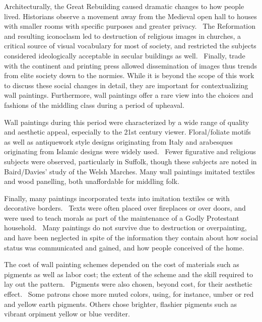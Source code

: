 Architecturally, the Great Rebuilding caused dramatic changes to how people lived. Historians observe a movement away from the Medieval open hall to houses with smaller rooms with specific purposes and greater privacy.~\autocite{Baird_thesis,Davies_book,Hamling_book} The Reformation and resulting iconoclasm led to destruction of religious images in churches, a critical source of visual vocabulary for most of society, and restricted the subjects considered ideologically acceptable in secular buildings as well.~\autocite{Kirkham_thesis,Hamling_book,Giles} Finally, trade with the continent and printing press allowed dissemination of images thus trends from elite society down to the normies. While it is beyond the scope of this work to discuss these social changes in detail, they are important for contextualizing wall paintings. Furthermore, wall paintings offer a rare view into the choices and fashions of the middling class during a period of upheaval.~\autocite{Kirkham_thesis,Baird_thesis}

Wall paintings during this period were characterized by a wide range of quality and aesthetic appeal, especially to the 21st century viewer. Floral/foliate motifs as well as antiquework style designs originating from Italy and arabesques originating from Islamic designs were widely used.~\autocite{Kirkham_thesis,Baird_thesis,Thornton_book} Fewer figurative and religious subjects were observed, particularly in Suffolk, though these subjects are noted in Baird/Davies' study of the Welsh Marches. Many wall paintings imitated textiles and wood panelling, both unaffordable for middling folk. 

Finally, many paintings incorporated texts into imitation textiles or with decorative borders.~\autocite{Baird_thesis,Kirkham_thesis} Texts were often placed over fireplaces or over doors, and were used to teach morals as part of the maintenance of a Godly Protestant household.~\autocite{Hamling_book} Many paintings do not survive due to destruction or overpainting, and have been neglected in spite of the information they contain about how social status was communicated and gained, and how people conceived of the home.~\autocite{Benton1,Benton2,Kirkham_thesis}

The cost of wall painting schemes depended on the cost of materials such as pigments as well as labor cost; the extent of the scheme and the skill required to lay out the pattern.~\autocite{Baird_thesis,Davies_book,Kirkham_thesis} Pigments were also chosen, beyond cost, for their aesthetic effect.~\autocite{Kirkham_thesis} Some patrons chose more muted colors, using, for instance, umber or red and yellow earth pigments. Others chose brighter, flashier pigments such as vibrant orpiment yellow or blue verditer. 

